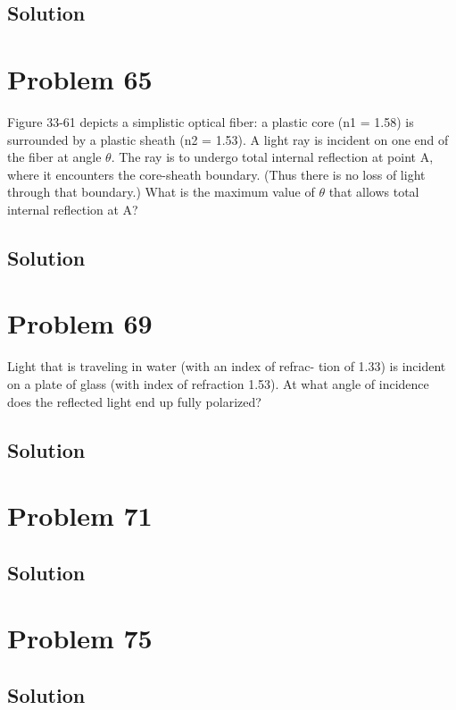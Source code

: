 \documentclass[12pt]{article}
\begin{document}
        \subsection{Solution}

    \pagebreak
    \section{Problem 65}
        Figure 33-61 depicts a
simplistic optical fiber: a plastic
core (n1 = 1.58) is surrounded by a
plastic sheath (n2 = 1.53). A light ray
is incident on one end of the fiber
at angle $\theta$. The ray is to undergo
total internal reflection at point A,
where it encounters the core-sheath
boundary. (Thus there is no loss of
light through that boundary.) What is the maximum value of $\theta$ that
allows total internal reflection at A?

        \subsection{Solution}

    \pagebreak
    \section{Problem 69}
        Light that is traveling in water (with an index of refrac-
tion of 1.33) is incident on a plate of glass (with index of refraction
1.53). At what angle of incidence does the reflected light end up
fully polarized?

        \subsection{Solution}

    \pagebreak
    \section{Problem 71}

        \subsection{Solution}

    \pagebreak
    \section{Problem 75}

        \subsection{Solution}
\end{document}
